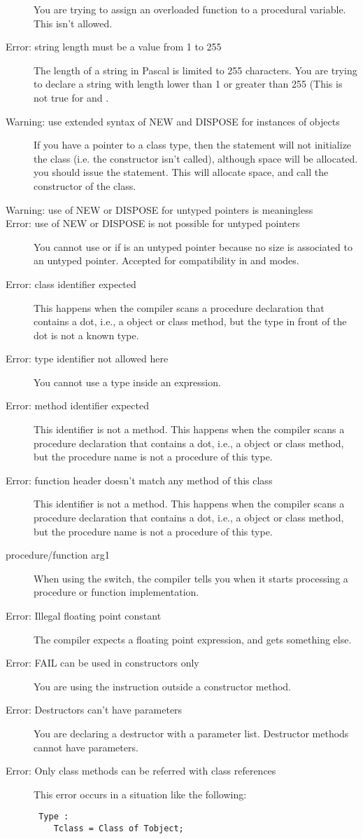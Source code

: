 \begin{description}
 You are trying to assign an overloaded function to a procedural variable.
 This isn't allowed.
\item [Error: string length must be a value from 1 to 255]
 The length of a string in Pascal is limited to 255 characters. You are
 trying to declare a string with length lower than 1 or greater than 255
 (This is not true for  and .
\item [Warning: use extended syntax of NEW and DISPOSE for instances of objects]
 If you have a pointer  to a class type, then the statement
  will not initialize the class (i.e. the constructor isn't
 called), although space will be allocated. you should issue the
  statement. This will allocate space, and call the
 constructor of the class.
\item [Warning: use of NEW or DISPOSE for untyped pointers is meaningless]
\item [Error: use of NEW or DISPOSE is not possible for untyped pointers]
 You cannot use  or  if  is an untyped pointer
 because no size is associated to an untyped pointer.
 Accepted for compatibility in  and  modes.
\item [Error: class identifier expected]
 This happens when the compiler scans a procedure declaration that contains
 a dot,
 i.e., a object or class method, but the type in front of the dot is not
 a known type.
\item [Error: type identifier not allowed here]
 You cannot use a type inside an expression.
\item [Error: method identifier expected]
 This identifier is not a method.
 This happens when the compiler scans a procedure declaration that contains
 a dot, i.e., a object or class method, but the procedure name is not a
 procedure of this type.
\item [Error: function header doesn't match any method of this class]
 This identifier is not a method.
 This happens when the compiler scans a procedure declaration that contains
 a dot, i.e., a object or class method, but the procedure name is not a
 procedure of this type.
\item [procedure/function arg1]
 When using the  switch, the compiler tells you when it starts
 processing a procedure or function implementation.
\item [Error: Illegal floating point constant]
 The compiler expects a floating point expression, and gets something else.
\item [Error: FAIL can be used in constructors only]
 You are using the  instruction outside a constructor method.
\item [Error: Destructors can't have parameters]
 You are declaring a destructor with a parameter list. Destructor methods
 cannot have parameters.
\item [Error: Only class methods can be referred with class references]
 This error occurs in a situation like the following:
 \begin{verbatim}
 Type :
    Tclass = Class of Tobject;


\end{verbatim}
\end{description}
